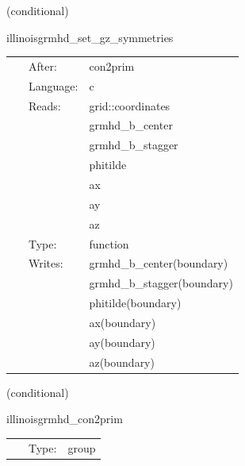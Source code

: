 \vspace{5mm}

   (conditional) 

\hspace{5mm} illinoisgrmhd\_set\_gz\_symmetries 

\hspace{5mm}{\it compute post-initialdata quantities } 


\hspace{5mm}

 \begin{tabular*}{160mm}{cll} 
~ & After:  & con2prim \\ 
~ & Language:  & c \\ 
~ & Reads:  & grid::coordinates \\ 
~& ~ &grmhd\_b\_center\\ 
~& ~ &grmhd\_b\_stagger\\ 
~& ~ &phitilde\\ 
~& ~ &ax\\ 
~& ~ &ay\\ 
~& ~ &az\\ 
~ & Type:  & function \\ 
~ & Writes:  & grmhd\_b\_center(boundary) \\ 
~& ~ &grmhd\_b\_stagger(boundary)\\ 
~& ~ &phitilde(boundary)\\ 
~& ~ &ax(boundary)\\ 
~& ~ &ay(boundary)\\ 
~& ~ &az(boundary)\\ 
\end{tabular*} 


\vspace{5mm}

   (conditional) 

\hspace{5mm} illinoisgrmhd\_con2prim 

\hspace{5mm}{\it compute primitive variables from conservatives } 


\hspace{5mm}

 \begin{tabular*}{160mm}{cll} 
~ & Type:  & group \\ 
\end{tabular*} 


\vspace{5mm}


